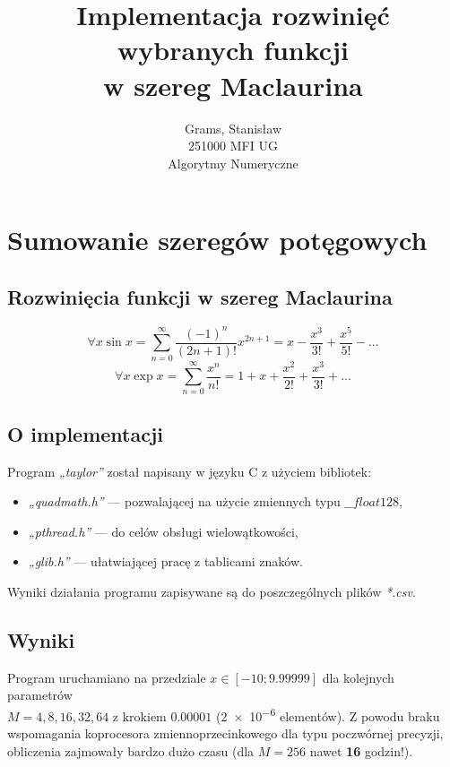 \documentclass[12pt]{article}
\begin{document}
\title{Implementacja rozwinięć wybranych funkcji\\w szereg Maclaurina}
\author{Grams, Stanisław\\251000 MFI UG\\Algorytmy Numeryczne}

\maketitle

\section{Sumowanie szeregów potęgowych}

\subsection{Rozwinięcia funkcji w szereg Maclaurina}
$$ \forall{x} \sin x = \sum_{n=0}^{\infty} \frac{(-1)^n}{(2n+1)!} x^{2n+1} = x - \frac{x^3}{3!} + \frac{x^5}{5!} - ...$$
$$ \forall {x} \exp{x} = \sum_{n=0}^{\infty} \frac{x^n}{n!} = 1 + x + \frac{x^2}{2!} + \frac{x^3}{3!} + ...$$

\subsection{O implementacji}
Program \textit{„taylor”} został napisany w języku C z użyciem bibliotek:
\begin{itemize}
    \item \textit{„quadmath.h”} — pozwalającej na użycie zmiennych typu $\_\_float128$,
    \item \textit{„pthread.h”} — do celów obsługi wielowątkowości,
    \item \textit{„glib.h”} — ułatwiającej pracę z tablicami znaków.
\end{itemize}
Wyniki działania programu zapisywane są do poszczególnych plików \textit{*.csv}.

\subsection{Wyniki}
Program uruchamiano na przedziale $x \in [-10; 9.99999]$ dla kolejnych parametrów\\$M = 4, 8, 16, 32, 64$ z krokiem $0.00001$ (\num{2e-6} elementów). Z powodu braku wspomagania koprocesora zmiennoprzecinkowego dla typu poczwórnej precyzji, obliczenia zajmowały bardzo dużo czasu (dla $M = 256$ nawet \textbf{16} godzin!).
\end{document}
